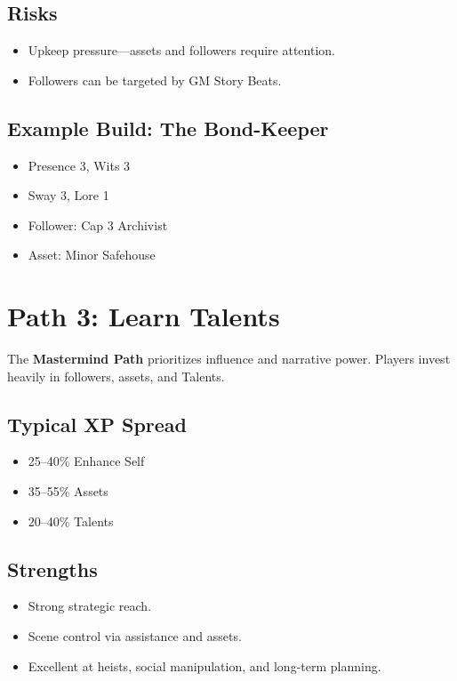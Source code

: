 \subsection*{Risks}
\begin{itemize}
  \item Upkeep pressure—assets and followers require attention.
  \item Followers can be targeted by GM Story Beats.
\end{itemize}

\subsection*{Example Build: The Bond-Keeper}
\begin{itemize}
  \item Presence 3, Wits 3
  \item Sway 3, Lore 1
  \item Follower: Cap 3 Archivist
  \item Asset: Minor Safehouse
\end{itemize}

\section{Path 3: Learn Talents}

The \textbf{Mastermind Path} prioritizes influence and narrative power. Players invest heavily in followers, assets, and Talents.

\subsection*{Typical XP Spread}
\begin{itemize}
  \item 25–40\% Enhance Self
  \item 35–55\% Assets
  \item 20–40\% Talents
\end{itemize}

\subsection*{Strengths}
\begin{itemize}
  \item Strong strategic reach.
  \item Scene control via assistance and assets.
  \item Excellent at heists, social manipulation, and long-term planning.
\end{itemize}

